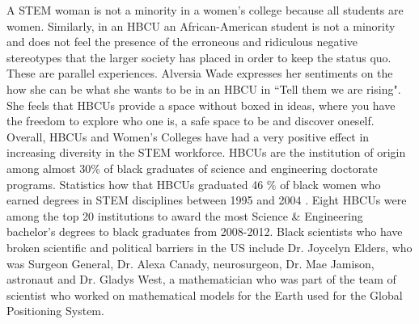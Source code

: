 \documentclass[utf8]{frontiersSCNS} %
\begin{document}
 A STEM woman is not a minority in a women’s college because all students are women.  Similarly, in an HBCU an African-American student is not a minority and does not feel the presence of the erroneous and ridiculous negative stereotypes that the larger society has placed in order to keep the status quo. These are parallel experiences. Alversia Wade expresses her sentiments on the how she can be what she wants to be in an HBCU in ``Tell them we are rising". She feels that HBCUs provide a space without boxed in ideas, where you have the freedom to explore who one is, a safe space to be and discover oneself. Overall, HBCUs and Women's Colleges have had a very positive effect in increasing diversity in the STEM workforce. HBCUs are the institution of origin among almost 30\% of black graduates of science and engineering doctorate programs.
Statistics how that HBCUs graduated 46 \% of black women who earned degrees in STEM disciplines between 1995 and 2004 \citep{HigherEdBlack}. Eight HBCUs were among the top 20 institutions to award the most Science & Engineering bachelor’s degrees to black graduates from 2008-2012. Black scientists who have broken scientific and political barriers in the US include Dr. Joycelyn Elders, who was Surgeon General, Dr. Alexa Canady, neurosurgeon, Dr. Mae Jamison, astronaut and Dr. Gladys West, a mathematician who was part of the team of scientist who worked on mathematical models for the Earth used for the Global Positioning System. 

\end{document}

